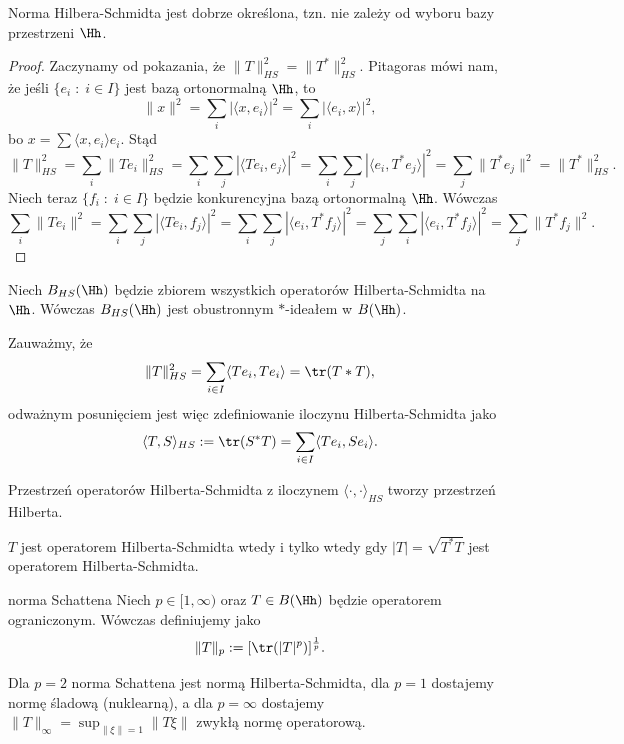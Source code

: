 \begin{fact}{}{}
  Norma Hilbera-Schmidta jest dobrze określona, tzn. nie zależy od wyboru bazy przestrzeni $\Hh$.
\end{fact}

\begin{proof}
  Zaczynamy od pokazania, że $\|T\|_{HS}^2=\|T^*\|_{HS}^2$. Pitagoras mówi nam, że jeśli $\{e_i\;:\;i\in I\}$ jest bazą ortonormalną $\Hh$, to
  $$\|x\|^2=\sum_i|\langle x, e_i\rangle|^2=\sum_i|\langle e_i, x\rangle|^2,$$
  bo $x=\sum\langle x,e_i\rangle e_i$. Stąd
  $$\|T\|_{HS}^2=\sum_i\|Te_i\|^2_{HS}=\sum_i\sum_j|\langle Te_i, e_j\rangle|^2=\sum_i\sum_j|\langle e_i, T^*e_j\rangle|^2=\sum_j\|T^*e_j\|^2=\|T^*\|_{HS}^2.$$
  Niech teraz $\{f_i\;:\;i\in I\}$ będzie konkurencyjna bazą ortonormalną $\Hh$. Wówczas
  $$\sum_i\|Te_i\|^2=\sum_i\sum_j|\langle Te_i, f_j\rangle|^2=\sum_i\sum_j|\langle e_i, T^*f_j\rangle|^2=\sum_j\sum_i|\langle e_i, T^*f_j\rangle|^2=\sum_j\|T^*f_j\|^2.$$
\end{proof}

\begin{remark}{}{}
  Niech $B_{HS}(\Hh)$ będzie zbiorem wszystkich operatorów Hilberta-Schmidta na $\Hh$. Wówczas $B_{HS}(\Hh)$ jest obustronnym $*$-ideałem w $B(\Hh)$.
\end{remark}

Zauważmy, że
$$\|T\|_{HS}^2=\sum_{i\in I}\langle Te_i, Te_i\rangle=\tr(T*T),$$
odważnym posunięciem jest więc zdefiniowanie iloczynu Hilberta-Schmidta jako
$$\langle T,S\rangle_{HS}:=\tr(S^*T)=\sum_{i\in I}\langle Te_i, Se_i\rangle.$$

\begin{remark}{}{}
  Przestrzeń operatorów Hilberta-Schmidta z iloczynem $\langle\cdot,\cdot\rangle_{HS}$ tworzy przestrzeń Hilberta.
\end{remark}

\begin{theorem}{}{}
  $T$ jest operatorem Hilberta-Schmidta wtedy i tylko wtedy gdy $|T|=\sqrt{T^*T}$ jest operatorem Hilberta-Schmidta.
\end{theorem}

\begin{definition}{norma Schattena}{}
  Niech $p\in[1,\infty)$ oraz $T\in B(\Hh)$ będzie operatorem ograniczonym. Wówczas definiujemy  jako
  $$\|T\|_p:=[\tr(|T|^p)]^{\frac{1}{p}}.$$
\end{definition}

Dla $p=2$ norma Schattena jest normą Hilberta-Schmidta, dla $p=1$ dostajemy normę śladową (nuklearną), a dla $p=\infty$ dostajemy $\|T\|_{\infty}=\sup_{\|\xi\|=1}\|T\xi\|$ zwykłą normę operatorową.

